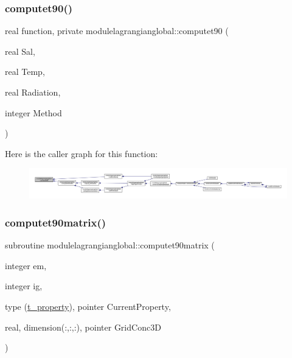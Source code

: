 \subsubsection{\texorpdfstring{computet90()}{computet90()}}
{\footnotesize\ttfamily real function, private modulelagrangianglobal\+::computet90 (\begin{DoxyParamCaption}\item[{real}]{Sal,  }\item[{real}]{Temp,  }\item[{real}]{Radiation,  }\item[{integer}]{Method }\end{DoxyParamCaption})\hspace{0.3cm}{\ttfamily [private]}}

Here is the caller graph for this function\+:\nopagebreak
\begin{figure}[H]
\begin{center}
\leavevmode
\includegraphics[width=350pt]{namespacemodulelagrangianglobal_a963d16d76b64077295c077df5dcf9e8d_icgraph}
\end{center}
\end{figure}
\mbox{\label{namespacemodulelagrangianglobal_aa1fa562342fd711319936084593cafbf}} 
\subsubsection{\texorpdfstring{computet90matrix()}{computet90matrix()}}
{\footnotesize\ttfamily subroutine modulelagrangianglobal\+::computet90matrix (\begin{DoxyParamCaption}\item[{integer}]{em,  }\item[{integer}]{ig,  }\item[{type (\mbox{\hyperlink{structmodulelagrangianglobal_1_1t__property}{t\+\_\+property}}), pointer}]{Current\+Property,  }\item[{real, dimension(\+:,\+:,\+:), pointer}]{Grid\+Conc3D }\end{DoxyParamCaption})\hspace{0.3cm}{\ttfamily [private]}}

